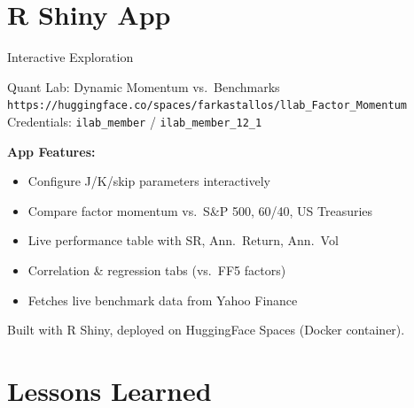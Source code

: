\documentclass[
  ignorenonframetext,
  aspectratio=169]{beamer}
\begin{document}
\section{R Shiny App}\label{r-shiny-app}

\begin{frame}{Interactive Exploration}
\label{interactive-exploration}
\begin{block}{Quant Lab: Dynamic Momentum vs.\ Benchmarks}
\texttt{https://huggingface.co/spaces/farkastallos/llab\_Factor\_Momentum}\\
Credentials: \texttt{ilab\_member} / \texttt{ilab\_member\_12\_1}
\end{block}

\bigskip

\textbf{App Features:}

\begin{itemize}
\item Configure J/K/skip parameters interactively
\item Compare factor momentum vs.\ S\&P 500, 60/40, US Treasuries
\item Live performance table with SR, Ann.\ Return, Ann.\ Vol
\item Correlation \& regression tabs (vs.\ FF5 factors)
\item Fetches live benchmark data from Yahoo Finance
\end{itemize}
\bigskip
\begin{alertblock}{}
Built with R Shiny, deployed on HuggingFace Spaces (Docker container).
\end{alertblock}
\end{frame}

\section{Lessons Learned}\label{lessons-learned}
\end{document}
